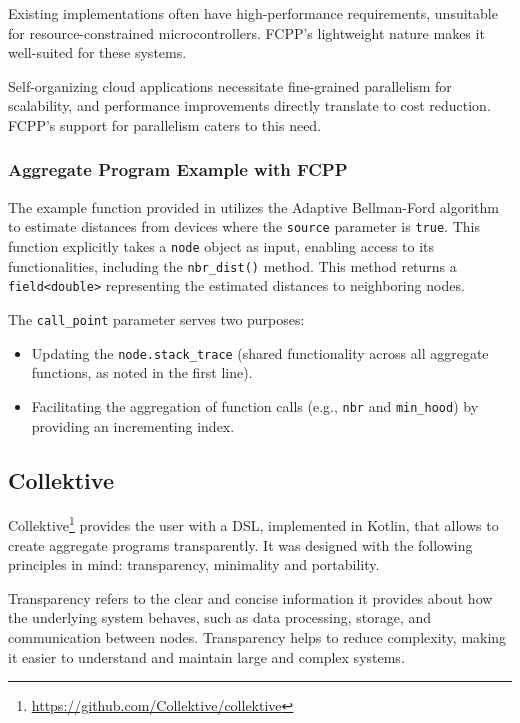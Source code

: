 Existing implementations often have high-performance requirements, unsuitable for resource-constrained microcontrollers. FCPP's lightweight nature makes it well-suited for these systems.

Self-organizing cloud applications necessitate fine-grained parallelism for scalability, and performance improvements directly translate to cost reduction. FCPP's support for parallelism caters to this need.

\subsubsection{Aggregate Program Example with FCPP}

The example function provided in  utilizes the Adaptive Bellman-Ford algorithm to estimate distances from devices where the \texttt{source} parameter is \texttt{true}. This function explicitly takes a \texttt{node} object as input, enabling access to its functionalities, including the \texttt{nbr\_dist()} method. This method returns a \texttt{field<double>} representing the estimated distances to neighboring nodes.

The \texttt{call\_point} parameter serves two purposes:

\begin{itemize}
    \item Updating the \texttt{node.stack\_trace} (shared functionality across all aggregate functions, as noted in the first line).
    \item Facilitating the aggregation of function calls (e.g., \texttt{nbr} and \texttt{min\_hood}) by providing an incrementing index.
\end{itemize}



\subsection{Collektive}

Collektive\footnote{\url{https://github.com/Collektive/collektive}} provides the user with a DSL, implemented in Kotlin, that allows to create aggregate programs transparently. It was designed with the following principles in mind: transparency, minimality and portability.

Transparency refers to the clear and concise information it provides about how the underlying system behaves, such as data processing, storage, and communication between nodes. Transparency helps to reduce complexity, making it easier to understand and maintain large and complex systems.

